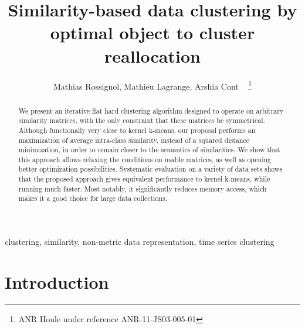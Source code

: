 \documentclass[10pt,journal,compsoc]{IEEEtran}
\begin{document}

\title{Similarity-based data clustering by optimal object to cluster reallocation}

\author{Mathias Rossignol, Mathieu Lagrange, Arshia Cont ~ \thanks{ANR Houle under reference ANR-11-JS03-005-01}}


\maketitle


\begin{abstract}

We present an iterative flat hard clustering algorithm designed to operate on arbitrary similarity matrices, with the only constraint that these matrices be symmetrical. Although functionally very close to kernel k-means, our proposal performs an maximization of average intra-class similarity, instead of a squared distance minimization, in order to remain closer to the semantics of similarities. We show that this approach allows relaxing the conditions on usable matrices, as well as opening better optimization possibilities. Systematic evaluation on a variety of data sets shows that the proposed approach gives equivalent performance to kernel k-means, while running much faster. Most notably, it significantly reduces memory access, which makes it a good choice for large data collections.

\end{abstract}

\begin{IEEEkeywords}
clustering, similarity, non-metric data representation, time series clustering
\end{IEEEkeywords}


\section{Introduction}
\end{document}
